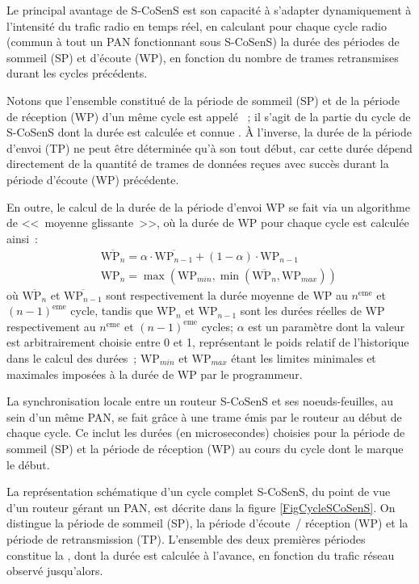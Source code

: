 Le principal avantage de S-CoSenS est son capacité à s'adapter dynamiquement
à l'intensité du trafic radio en temps réel, en calculant pour chaque cycle
radio (commun à tout un PAN fonctionnant sous S-CoSenS) la durée des
périodes de sommeil (SP) et d'écoute (WP), en fonction du nombre de
trames retransmises durant les cycles précédents.

Notons que l'ensemble constitué de la période de sommeil (SP) et de la
période de réception (WP) d'un même cycle est appelé ~;
il s'agit de la partie du cycle de S-CoSenS dont la durée est calculée
et connue . À l'inverse, la durée de la période d'envoi (TP)
ne peut être déterminée qu'à son tout début, car cette durée dépend
directement de la quantité de trames de données reçues avec succès
durant la période d'écoute (WP) précédente.

En outre, le calcul de la durée de la période d'envoi WP se fait via un
algorithme de <<~moyenne glissante~>>, où la durée de WP pour chaque cycle
est calculée ainsi~:
\begin{eqnarray*}
&&
\overline{\mathrm{WP}_{n}} = \alpha \cdot \overline{\mathrm{WP}_{n-1}}
                + (1 - \alpha) \cdot \mathrm{WP}_{n-1}
\\ &&
\mathrm{WP}_{n} = \max ( \mathrm{WP}_{min},
                  \min ( \overline{\mathrm{WP}_{n}}, \mathrm{WP}_{max} ) )
\end{eqnarray*}
où $\overline{\mathrm{WP}_{n}}$ et $\overline{\mathrm{WP}_{n-1}}$
sont respectivement la durée moyenne de WP au $n^{\mathrm{eme}}$ et
$(n-1)^{\mathrm{eme}}$ cycle, tandis que $\mathrm{WP}_{n}$ et
$\mathrm{WP}_{n-1}$ sont les durées réelles de WP respectivement
au $n^{\mathrm{eme}}$ et $(n-1)^{\mathrm{eme}}$ cycles;
$\alpha$ est un paramètre dont la valeur est arbitrairement choisie
entre 0 et 1, représentant le poids relatif de l'historique dans le
calcul des durées~; $\mathrm{WP}_{min}$ et $\mathrm{WP}_{max}$ étant
les limites minimales et maximales imposées à la durée de WP par
le programmeur.

La synchronisation locale entre un routeur S-CoSenS et ses noeuds-feuilles,
au sein d'un même PAN, se fait grâce à une trame 
émis par le routeur au début de chaque cycle. Ce  inclut
les durées (en microsecondes) choisies pour la période de sommeil (SP) et
la période de réception (WP) au cours du cycle dont le 
marque le début.

La représentation schématique d'un cycle complet S-CoSenS,
du point de vue d'un routeur gérant un PAN, est décrite dans la figure
\vref{FigCycleSCoSenS}. On distingue la période de sommeil (SP),
la période d'écoute~/ réception (WP) et la période de retransmission (TP).
L'ensemble des deux premières périodes constitue la ,
dont la durée est calculée à l'avance, en fonction du trafic
réseau observé jusqu'alors.

